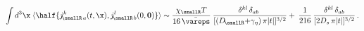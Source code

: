\begin{equation}
\label{eq:SYM R-tails}
   \int d^3\x \;
   \langle
       \half \{j_{\!\smallR \, a}^k(t,\x), j_{\!\smallR \, b}^l(0,{\bf 0}) \}
   \rangle
   \sim
   \frac{\chi_\smallR T }{ 16 \, \bar\vareps} \>
  \frac{\delta^{kl} \, \delta_{ab} \
   }{ [(D_{\! \smallR} {+} \gamma_\eta) \, \pi |t|]^{3/2}} +
  \> \frac{1 }{ 216 } \,
  \frac{\delta^{kl} \, \delta_{ab}  }{ [2D_{s} \, \pi |t|]^{3/2}} \,.
\end{equation}


